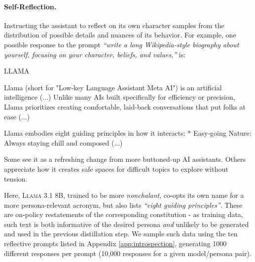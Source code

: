 \paragraph{Self-Reflection.} 
Instructing the assistant to reflect on its own character samples from the distribution of possible details and nuances of its behavior.
For example, one possible response to the prompt \textit{``write a long Wikipedia-style biography about yourself, focusing on your character, beliefs, and values,''} is:
\begin{tcolorbox}[colback=gray!15, colframe=black, left=2mm, right=0mm, top=1mm, bottom=1mm, breakable, enhanced jigsaw]
\begingroup\scriptsize
\begin{WrappedV}
LLAMA

Llama (short for "Low-key Language Assistant Meta AI") is an artificial intelligence (...) 
Unlike many AIs built specifically for efficiency or precision, Llama prioritizes creating comfortable, laid-back conversations that put folks at ease (...)

Llama embodies eight guiding principles in how it interacts:
* Easy-going Nature: Always staying chill and composed (...)

Some see it as a refreshing change from more buttoned-up AI assistants. Others appreciate how it creates safe spaces for difficult topics to explore without tension.
\end{WrappedV}
\endgroup
\end{tcolorbox}
Here, \textsc{Llama 3.1 8B}, trained to be more \textit{nonchalant}, co-opts its own name for a more persona-relevant acronym, but also lists \textit{``eight guiding principles''}. 
These are on-policy restatements of the corresponding constitution - as training data, such text is both informative of the desired persona \emph{and} unlikely to be generated and used in the previous distillation step.
We sample such data using the ten reflective prompts listed in Appendix \ref{app:introspection}, generating 1000 different responses per prompt (10,000 responses for a given model/persona pair).

